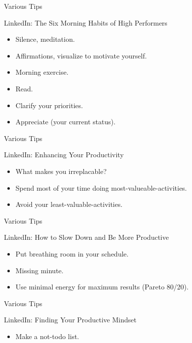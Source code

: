 \begin{frame}{Various Tips}
  \begin{block}{LinkedIn: The Six Morning Habits of High Performers}
    \begin{itemize}
      \item Silence, meditation.
      \item Affirmations, visualize to motivate yourself.
      \item Morning exercise. 
      \item Read. 
      \item Clarify your priorities.
      \item Appreciate (your current status).
    \end{itemize}
  \end{block}
\end{frame}

\begin{frame}{Various Tips}
  \begin{block}{LinkedIn: Enhancing Your Productivity}
    \begin{itemize}
      \item What makes you irreplacable?
      \item Spend most of your time doing most-valueable-activities.
      \item Avoid your least-valuable-activities.
    \end{itemize}
  \end{block}
\end{frame}

\begin{frame}{Various Tips}
  \begin{block}{LinkedIn: How to Slow Down and Be More Productive}
    \begin{itemize}
      \item Put breathing room in your schedule.
      \item Missing minute.
      \item Use minimal energy for maximum results (Pareto 80/20).
    \end{itemize}
  \end{block}
\end{frame}

\begin{frame}{Various Tips}
  \begin{block}{LinkedIn: Finding Your Productive Mindset}
    \begin{itemize}
      \item Make a not-todo list.
    \end{itemize}
  \end{block}
\end{frame}


